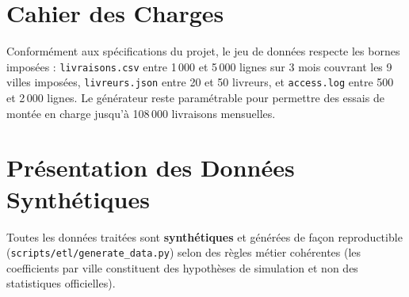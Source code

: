 \documentclass[11pt,a4paper]{article}
\begin{document}
\section{Cahier des Charges}
Conform\'ement aux sp\'ecifications du projet, le jeu de donn\'ees respecte les bornes impos\'ees : \texttt{livraisons.csv} entre 1\,000 et 5\,000 lignes sur 3 mois couvrant les 9 villes impos\'ees, \texttt{livreurs.json} entre 20 et 50 livreurs, et \texttt{access.log} entre 500 et 2\,000 lignes. Le g\'en\'erateur reste param\'etrable pour permettre des essais de mont\'ee en charge jusqu'\`a 108\,000 livraisons mensuelles.

\section{Pr\'esentation des Donn\'ees Synth\'etiques}
Toutes les donn\'ees trait\'ees sont \textbf{synth\'etiques} et g\'en\'er\'ees de fa\c{c}on reproductible (\texttt{scripts/etl/generate\_data.py}) selon des r\`egles m\'etier coh\'erentes (les coefficients par ville constituent des hypoth\`eses de simulation et non des statistiques officielles).
\end{document}

